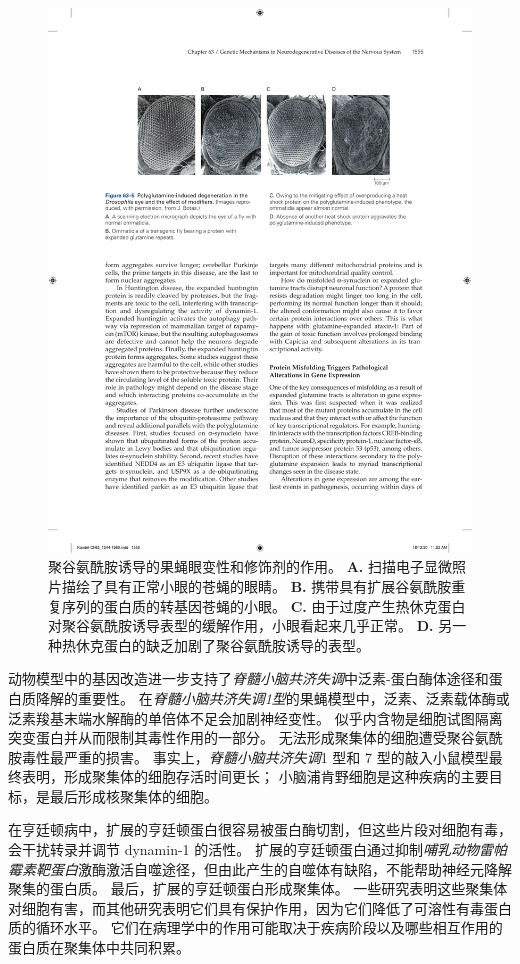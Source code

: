 \begin{figure}[htbp]
	\centering
	\includegraphics[width=0.7\linewidth]{chap63/fig_63_5}
	\caption{聚谷氨酰胺诱导的果蝇眼变性和修饰剂的作用。 
		\textbf{A.} 扫描电子显微照片描绘了具有正常小眼的苍蝇的眼睛。
		\textbf{B.} 携带具有扩展谷氨酰胺重复序列的蛋白质的转基因苍蝇的小眼。
		\textbf{C.} 由于过度产生热休克蛋白对聚谷氨酰胺诱导表型的缓解作用，小眼看起来几乎正常。
		\textbf{D.} 另一种热休克蛋白的缺乏加剧了聚谷氨酰胺诱导的表型。}
	\label{fig:63_5}
\end{figure}


动物模型中的基因改造进一步支持了\textit{脊髓小脑共济失调}中泛素-蛋白酶体途径和蛋白质降解的重要性。
在\textit{脊髓小脑共济失调1型}的果蝇模型中，泛素、泛素载体酶或泛素羧基末端水解酶的单倍体不足会加剧神经变性。
似乎内含物是细胞试图隔离突变蛋白并从而限制其毒性作用的一部分。
无法形成聚集体的细胞遭受聚谷氨酰胺毒性最严重的损害。
事实上，\textit{脊髓小脑共济失调}1 型和 7 型的敲入小鼠模型最终表明，形成聚集体的细胞存活时间更长；
小脑浦肯野细胞是这种疾病的主要目标，是最后形成核聚集体的细胞。


在亨廷顿病中，扩展的亨廷顿蛋白很容易被蛋白酶切割，但这些片段对细胞有毒，会干扰转录并调节 dynamin-1 的活性。
扩展的亨廷顿蛋白通过抑制\textit{哺乳动物雷帕霉素靶蛋白}激酶激活自噬途径，但由此产生的自噬体有缺陷，不能帮助神经元降解聚集的蛋白质。
最后，扩展的亨廷顿蛋白形成聚集体。
一些研究表明这些聚集体对细胞有害，而其他研究表明它们具有保护作用，因为它们降低了可溶性有毒蛋白质的循环水平。
它们在病理学中的作用可能取决于疾病阶段以及哪些相互作用的蛋白质在聚集体中共同积累。


